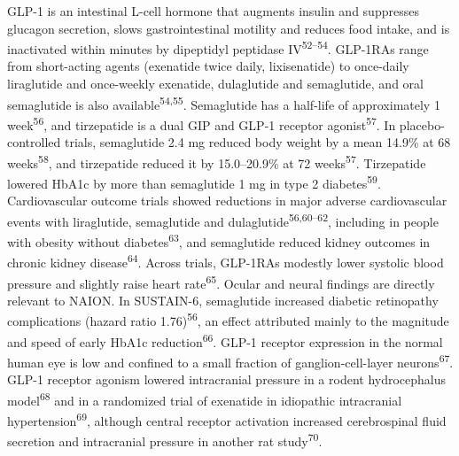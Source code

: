 \documentclass[
  11pt,
]{article}
\begin{document}
GLP-1 is an intestinal L-cell hormone that augments insulin and
suppresses glucagon secretion, slows gastrointestinal motility and
reduces food intake, and is inactivated within minutes by dipeptidyl
peptidase IV\textsuperscript{52--54}. GLP-1RAs range from short-acting
agents (exenatide twice daily, lixisenatide) to once-daily liraglutide
and once-weekly exenatide, dulaglutide and semaglutide, and oral
semaglutide is also available\textsuperscript{54,55}. Semaglutide has a
half-life of approximately 1 week\textsuperscript{56}, and tirzepatide
is a dual GIP and GLP-1 receptor agonist\textsuperscript{57}. In
placebo-controlled trials, semaglutide 2.4 mg reduced body weight by a
mean 14.9\% at 68 weeks\textsuperscript{58}, and tirzepatide reduced it
by 15.0--20.9\% at 72 weeks\textsuperscript{57}. Tirzepatide lowered
HbA1c by more than semaglutide 1 mg in type 2
diabetes\textsuperscript{59}. Cardiovascular outcome trials showed
reductions in major adverse cardiovascular events with liraglutide,
semaglutide and dulaglutide\textsuperscript{56,60--62}, including in
people with obesity without diabetes\textsuperscript{63}, and
semaglutide reduced kidney outcomes in chronic kidney
disease\textsuperscript{64}. Across trials, GLP-1RAs modestly lower
systolic blood pressure and slightly raise heart
rate\textsuperscript{65}. Ocular and neural findings are directly
relevant to NAION. In SUSTAIN-6, semaglutide increased diabetic
retinopathy complications (hazard ratio 1.76)\textsuperscript{56}, an
effect attributed mainly to the magnitude and speed of early HbA1c
reduction\textsuperscript{66}. GLP-1 receptor expression in the normal
human eye is low and confined to a small fraction of ganglion-cell-layer
neurons\textsuperscript{67}. GLP-1 receptor agonism lowered intracranial
pressure in a rodent hydrocephalus model\textsuperscript{68} and in a
randomized trial of exenatide in idiopathic intracranial
hypertension\textsuperscript{69}, although central receptor activation
increased cerebrospinal fluid secretion and intracranial pressure in
another rat study\textsuperscript{70}.
\end{document}
